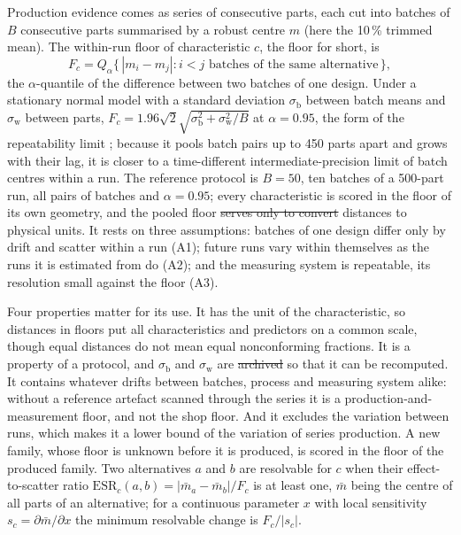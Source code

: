 \documentclass[pdflatex,sn-basic,lineno]{sn-jnl}
\newcommand{\ORt}[1]{Online Resource~1, Table~S#1} %
\providecommand{\DIFadd}[1]{{\protect\color{blue}\uwave{#1}}} %
\providecommand{\DIFdel}[1]{{\protect\color{red}\sout{#1}}}                      %
\providecommand{\DIFaddbegin}{} %
\providecommand{\DIFaddend}{} %
\providecommand{\DIFdelbegin}{} %
\providecommand{\DIFdelend}{} %
\newcommand{\DIFscaledelfig}{0.5}
\newlength{\DIFdelgraphicswidth} %
\newlength{\DIFdelgraphicsheight} %
\newcommand{\DIFaddincludegraphics}[2][]{{\color{blue}\fbox{\DIFOincludegraphics[#1]{#2}}}} %
\newcommand{\DIFdelincludegraphics}[2][]{%
\sbox{\DIFdelgraphicsbox}{\DIFOincludegraphics[#1]{#2}}%
\settoboxwidth{\DIFdelgraphicswidth}{\DIFdelgraphicsbox} %
\settoboxtotalheight{\DIFdelgraphicsheight}{\DIFdelgraphicsbox} %
\scalebox{\DIFscaledelfig}{%
\parbox[b]{\DIFdelgraphicswidth}{\usebox{\DIFdelgraphicsbox}\\[-\baselineskip] \rule{\DIFdelgraphicswidth}{0em}}\llap{\resizebox{\DIFdelgraphicswidth}{\DIFdelgraphicsheight}{%
\setlength{\unitlength}{\DIFdelgraphicswidth}%
\begin{picture}(1,1)%
\thicklines\linethickness{2pt} %
{\color[rgb]{1,0,0}\put(0,0){\framebox(1,1){}}}%
{\color[rgb]{1,0,0}\put(0,0){\line( 1,1){1}}}%
{\color[rgb]{1,0,0}\put(0,1){\line(1,-1){1}}}%
\end{picture}%
}\hspace*{3pt}}} %
} %
\DeclareRobustCommand{\DIFaddbegin}{\DIFOaddbegin \let\includegraphics\DIFaddincludegraphics} %
\DeclareRobustCommand{\DIFaddend}{\DIFOaddend \let\includegraphics\DIFOincludegraphics} %
\DeclareRobustCommand{\DIFdelbegin}{\DIFOdelbegin \let\includegraphics\DIFdelincludegraphics} %
\DeclareRobustCommand{\DIFdelend}{\DIFOaddend \let\includegraphics\DIFOincludegraphics} %
\begin{document}
Production evidence comes as series of consecutive parts, each cut into batches of $B$ consecutive parts summarised by a robust centre $m$ (here the 10\,\% trimmed mean). The within-run floor of characteristic $c$, the floor for short, is
\begin{equation}
F_c = Q_\alpha\bigl\{\,|m_i - m_j| : i< j \text{ batches of the same alternative}\,\bigr\},
\label{eq:floor}
\end{equation}
the $\alpha$-quantile of the difference between two batches of one design. Under a stationary normal model with a standard deviation $\sigma_\mathrm{b}$ between batch means and $\sigma_\mathrm{w}$ between parts, $F_c = 1.96\sqrt{2}\sqrt{\sigma_\mathrm{b}^2+\sigma_\mathrm{w}^2/B}$ at $\alpha=0.95$, the form of the repeatability limit \citep{iso2025repeatability, iso1994accuracy}; because it pools batch pairs up to 450 parts apart and grows with their lag, it is closer to a time-different intermediate-precision limit \citep{iso2023intermediate} of batch centres within a run. The reference protocol is $B=50$, ten batches of a 500-part run, all pairs of batches and $\alpha=0.95$; every characteristic is scored in the floor of its own geometry, and the pooled floor \DIFdelbegin \DIFdel{serves only to convert }\DIFdelend \DIFaddbegin \DIFadd{only converts }\DIFaddend distances to physical units. It rests on three assumptions: batches of one design differ only by drift and scatter within a run (A1); future runs vary within themselves as the runs it is estimated from do (A2); and the measuring system is repeatable, its resolution small against the floor (A3).

Four properties matter for its use. It has the unit of the characteristic, so distances in floors put all characteristics and predictors on a common scale, though equal distances do not mean equal nonconforming fractions. It is a property of a protocol, and $\sigma_\mathrm{b}$ and $\sigma_\mathrm{w}$ are \DIFdelbegin \DIFdel{archived }\DIFdelend \DIFaddbegin \DIFadd{reported (\ORt{4}) }\DIFaddend so that it can be recomputed. It contains whatever drifts between batches, process and measuring system alike: without a reference artefact scanned through the series it is a production-and-measurement floor, and not the shop floor. And it excludes the variation between runs, which makes it a lower bound of the variation of series production. A new family, whose floor is unknown before it is produced, is scored in the floor of the produced family. Two alternatives $a$ and $b$ are resolvable for $c$ when their effect-to-scatter ratio $\mathrm{ESR}_c(a,b) = |\bar m_a - \bar m_b|/F_c$ is at least one, $\bar m$ being the centre of all parts of an alternative; for a continuous parameter $x$ with local sensitivity $s_c=\partial\bar m/\partial x$ the minimum resolvable change is $F_c/|s_c|$.
\end{document}
